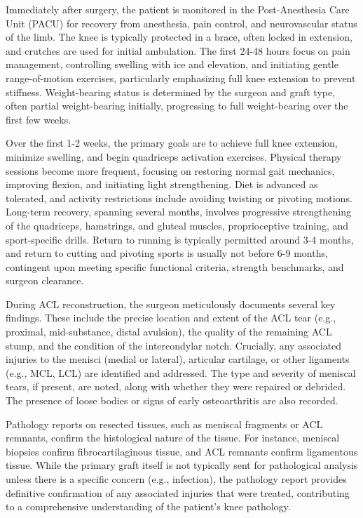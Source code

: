 Immediately after surgery, the patient is monitored in the Post-Anesthesia Care Unit (PACU) for recovery from anesthesia, pain control, and neurovascular status of the limb. The knee is typically protected in a brace, often locked in extension, and crutches are used for initial ambulation. The first 24-48 hours focus on pain management, controlling swelling with ice and elevation, and initiating gentle range-of-motion exercises, particularly emphasizing full knee extension to prevent stiffness. Weight-bearing status is determined by the surgeon and graft type, often partial weight-bearing initially, progressing to full weight-bearing over the first few weeks.

Over the first 1-2 weeks, the primary goals are to achieve full knee extension, minimize swelling, and begin quadriceps activation exercises. Physical therapy sessions become more frequent, focusing on restoring normal gait mechanics, improving flexion, and initiating light strengthening. Diet is advanced as tolerated, and activity restrictions include avoiding twisting or pivoting motions. Long-term recovery, spanning several months, involves progressive strengthening of the quadriceps, hamstrings, and gluteal muscles, proprioceptive training, and sport-specific drills. Return to running is typically permitted around 3-4 months, and return to cutting and pivoting sports is usually not before 6-9 months, contingent upon meeting specific functional criteria, strength benchmarks, and surgeon clearance.

During ACL reconstruction, the surgeon meticulously documents several key findings. These include the precise location and extent of the ACL tear (e.g., proximal, mid-substance, distal avulsion), the quality of the remaining ACL stump, and the condition of the intercondylar notch. Crucially, any associated injuries to the menisci (medial or lateral), articular cartilage, or other ligaments (e.g., MCL, LCL) are identified and addressed. The type and severity of meniscal tears, if present, are noted, along with whether they were repaired or debrided. The presence of loose bodies or signs of early osteoarthritis are also recorded.

Pathology reports on resected tissues, such as meniscal fragments or ACL remnants, confirm the histological nature of the tissue. For instance, meniscal biopsies confirm fibrocartilaginous tissue, and ACL remnants confirm ligamentous tissue. While the primary graft itself is not typically sent for pathological analysis unless there is a specific concern (e.g., infection), the pathology report provides definitive confirmation of any associated injuries that were treated, contributing to a comprehensive understanding of the patient's knee pathology.

